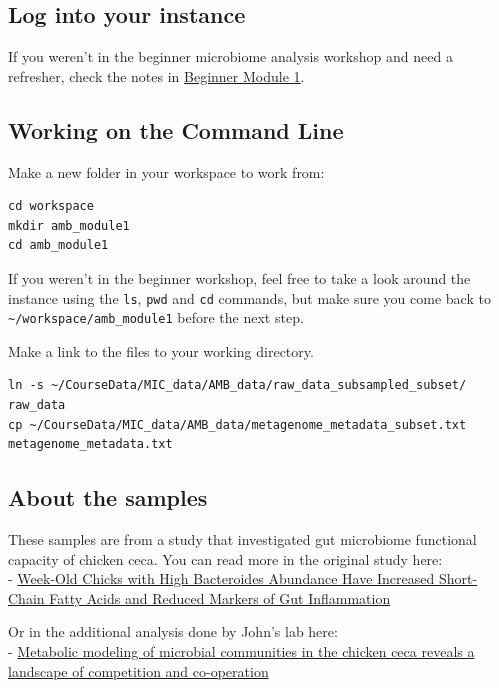 \documentclass[
]{book}
\begin{document}
\subsection{Log into your instance}\label{log-into-your-instance}

If you weren't in the beginner microbiome analysis workshop and need a refresher, check the notes in \href{https://bioinformaticsdotca.github.io/BMB_2025/module-1.html\#log-into-your-aws-instance}{Beginner Module 1}.

\subsection{Working on the Command Line}\label{working-on-the-command-line}

Make a new folder in your workspace to work from:

\begin{verbatim}
cd workspace
mkdir amb_module1
cd amb_module1
\end{verbatim}

If you weren't in the beginner workshop, feel free to take a look around the instance using the \texttt{ls}, \texttt{pwd} and \texttt{cd} commands, but make sure you come back to \texttt{\textasciitilde{}/workspace/amb\_module1} before the next step.

Make a link to the files to your working directory.

\begin{verbatim}
ln -s ~/CourseData/MIC_data/AMB_data/raw_data_subsampled_subset/ raw_data
cp ~/CourseData/MIC_data/AMB_data/metagenome_metadata_subset.txt metagenome_metadata.txt
\end{verbatim}

\subsection{About the samples}\label{about-the-samples}

These samples are from a study that investigated gut microbiome functional capacity of chicken ceca. You can read more in the original study here:\\
- \href{https://journals.asm.org/doi/full/10.1128/spectrum.03616-22}{Week-Old Chicks with High Bacteroides Abundance Have Increased Short-Chain Fatty Acids and Reduced Markers of Gut Inflammation}

Or in the additional analysis done by John's lab here:\\
- \href{https://www.biorxiv.org/content/10.1101/2024.10.14.618310v1.full}{Metabolic modeling of microbial communities in the chicken ceca reveals a landscape of competition and co-operation}
\end{document}
